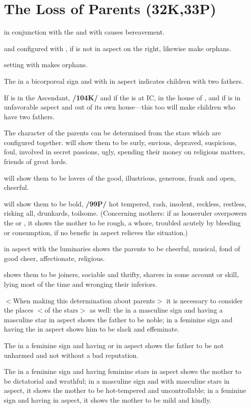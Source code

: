 \section{The Loss of Parents (32K,33P)}

\Mars\xspace in conjunction with the \Sun\xspace and \Square\xspace with \Saturn\xspace causes bereavement. 

\Saturn\xspace and \Mars\xspace configured with \Mercury, if \Jupiter\xspace is not in aspect on the right, likewise make orphans. 

\Saturn\xspace setting with \Jupiter\xspace makes orphans. 

The \Moon\xspace in a bicorporeal sign and with \Jupiter\xspace in aspect indicates children with two fathers. 

If \Venus\xspace is in the Ascendant, \textbf{/104K/} and if the \Moon\xspace is at IC, in the house of \Mars, and if \Jupiter\xspace is in unfavorable aspect and out of its own house—this too will make children who have two fathers.

The character of the parents can be determined from the stars which are configured together. \Saturn\xspace will show them to be surly, envious, depraved, suspicious, foul, involved in secret passions, ugly, spending their money on religious matters, friends of great lords. 

\Jupiter\xspace will show them to be lovers of the good, illustrious, generous, frank and open, cheerful. 

\Mars\xspace will show them to be bold, \textbf{/99P/} hot tempered, rash, insolent, reckless, restless, risking all, drunkards, toilsome. (Concerning mothers: if \Mars\xspace
as houseruler overpowers the \Moon\xspace or \Venus, it shows the mother to be rough, a whore, troubled acutely by bleeding or consumption, if no benefic in aspect relieves the situation.) 

\Venus\xspace in aspect with the luminaries shows the parents to be cheerful, musical, fond of good cheer, affectionate, religious. 

\Mercury\xspace shows them to be joiners, sociable and thrifty, sharers in some account or skill, lying most of the time and
wronging their inferiors.

$<$When making this determination about parents$>$ it is necessary to consider the places $<$of the stars$>$
as well: the \Sun\xspace in a masculine sign and having a masculine star in aspect shows the father to be noble; in a
feminine sign and having the \Moon\xspace in aspect shows him to be slack and effeminate. 

The \Sun\xspace in a feminine sign and having \Saturn\xspace or \Venus\xspace in aspect shows the father to be not unharmed and not without a bad reputation. 

The \Moon\xspace in a feminine sign and having feminine stars in aspect shows the mother to be dictatorial and wrathful; in a masculine sign and with masculine stars in aspect, it shows the mother to be hot-tempered and uncontrollable; in a feminine sign and having \Jupiter\xspace in aspect, it shows the mother to be mild and kindly.

\newpage